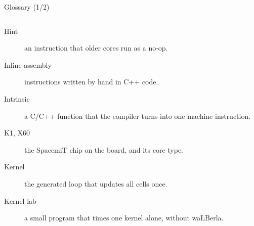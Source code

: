 \documentclass[aspectratio=169,10pt,t]{beamer}
\begin{document}
\begin{frame}{Glossary (1/2)}
\begin{columns}[T,onlytextwidth]
\begin{description}
      \item[Hint] an instruction that older cores run as a no-op.
      \item[Inline assembly] instructions written by hand in C++ code.
      \item[Intrinsic] a C/C++ function that the compiler turns into one machine instruction.
      \item[K1, X60] the SpacemiT chip on the board, and its core type.
      \item[Kernel] the generated loop that updates all cells once.
      \item[Kernel lab] a small program that times one kernel alone, without waLBerla.
    \end{description}
  \end{columns}
\end{frame}
\end{document}
